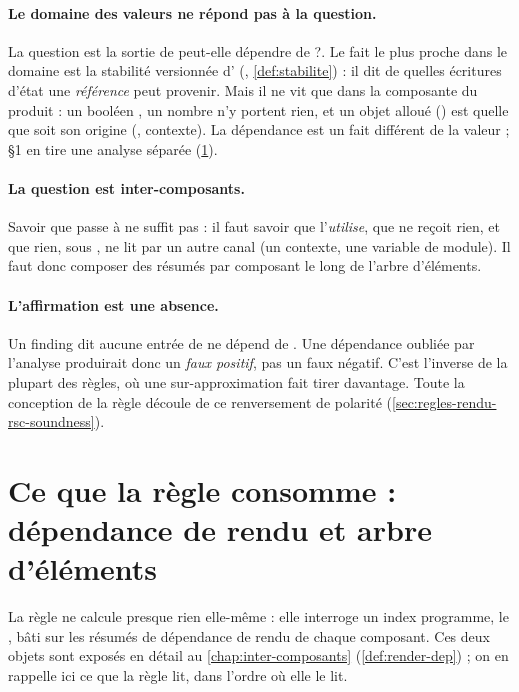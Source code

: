 \paragraph{Le domaine des valeurs ne répond pas à la question.} La question est \og la sortie de
 peut-elle dépendre de  ?\fg{}. Le fait le plus proche dans le
domaine est la stabilité versionnée d' (, \cref{def:stabilite}) : il
dit de quelles écritures d'état une \emph{référence} peut provenir. Mais il ne vit que dans la
composante  du produit  : un booléen , un nombre
 n'y portent rien, et un objet alloué () est
 quelle que soit son origine (, contexte). La dépendance est un fait
différent de la valeur ;  §1 en tire une analyse séparée
(\cref{sec:regles-rendu-rsc-deps}).

\paragraph{La question est inter-composants.} Savoir que  passe  à
 ne suffit pas : il faut savoir que  l'\emph{utilise}, que
 ne reçoit rien, et que rien, sous , ne lit  par un autre
canal (un contexte, une variable de module). Il faut donc composer des résumés par composant le
long de l'arbre d'éléments.

\paragraph{L'affirmation est une absence.} Un finding dit \og aucune entrée de 
ne dépend de \fg{}. Une dépendance oubliée par l'analyse produirait donc un
\emph{faux positif}, pas un faux négatif. C'est l'inverse de la plupart des règles, où une
sur-approximation fait tirer davantage. Toute la conception de la règle découle de ce
renversement de polarité (\cref{sec:regles-rendu-rsc-soundness}).

\section{Ce que la règle consomme : dépendance de rendu et arbre d'éléments}
\label{sec:regles-rendu-rsc-deps}

La règle ne calcule presque rien elle-même : elle interroge un index programme, le
, bâti sur les résumés de dépendance de rendu de chaque composant. Ces deux
objets sont exposés en détail au \cref{chap:inter-composants} (\cref{def:render-dep}) ; on en
rappelle ici ce que la règle lit, dans l'ordre où elle le lit.

